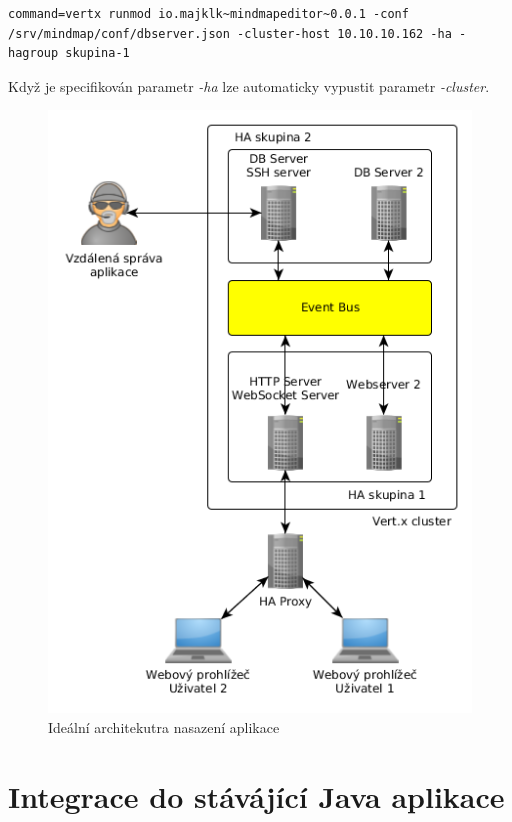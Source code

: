 \begin{lstlisting}[caption=Vysoká dostupnost na databázovém serveru 2]
command=vertx runmod io.majklk~mindmapeditor~0.0.1 -conf /srv/mindmap/conf/dbserver.json -cluster-host 10.10.10.162 -ha -hagroup skupina-1
\end{lstlisting}

Když je specifikován parametr \emph{-ha} lze automaticky vypustit parametr \emph{-cluster}.

\begin{figure}
\begin{centering}
\includegraphics[scale=0.5]{obrazky/architecture_ideal}
\par\end{centering}
\caption{Ideální architekutra nasazení aplikace\label{fig:architecture_ideal}}
\end{figure}

\section{Integrace do stávájící Java aplikace}

